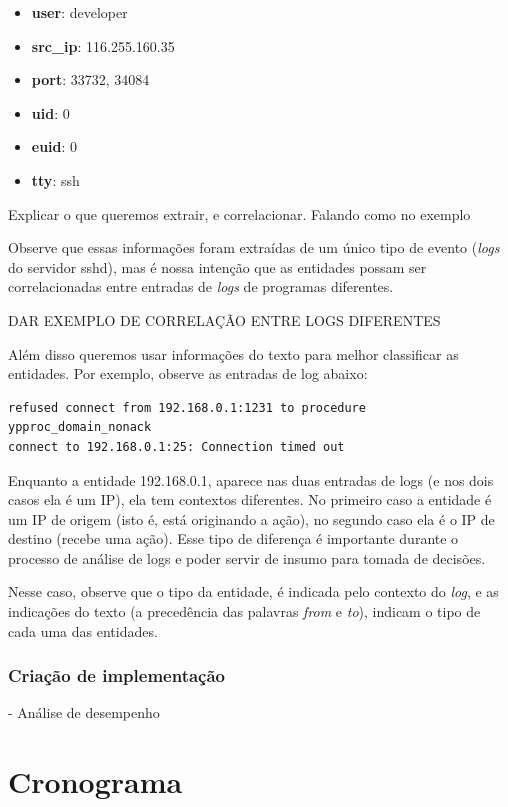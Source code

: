 \documentclass[
	12pt,				%
	openright,			%
	twoside,			%
	a4paper,			%
	english,			%
	french,				%
	spanish,			%
	brazil,				%
	]{abntex2}
\begin{document}
\begin{itemize}
	\item \textbf{user}: developer	
	\item \textbf{src\_ip}: 116.255.160.35	
	\item \textbf{port}: 33732, 34084	
	\item \textbf{uid}: 0	
	\item \textbf{euid}: 0	
	\item \textbf{tty}: ssh 
\end{itemize}

Explicar o que queremos extrair, e correlacionar. Falando como no exemplo

Observe que essas informações foram extraídas de um único tipo de evento (\emph{logs} do servidor sshd), mas é nossa intenção que as entidades possam ser correlacionadas entre entradas de \emph{logs} de programas diferentes.

DAR EXEMPLO DE CORRELAÇÃO ENTRE LOGS DIFERENTES

Além disso queremos usar informações do texto para melhor classificar as entidades.
Por exemplo, observe as entradas de log abaixo:

{\tiny
\begin{verbatim}
refused connect from 192.168.0.1:1231 to procedure ypproc_domain_nonack 
connect to 192.168.0.1:25: Connection timed out
\end{verbatim}
}

Enquanto a entidade 192.168.0.1, aparece nas duas entradas de logs (e nos dois casos ela é um IP), ela tem contextos diferentes. No primeiro caso a entidade é um IP de origem (isto é, está originando a ação), no segundo caso ela é o IP de destino (recebe uma ação). Esse tipo de diferença é importante durante o processo de análise de logs e poder servir de insumo para tomada de decisões.

Nesse caso, observe que o tipo da entidade, é indicada pelo contexto do \emph{log}, e as indicações do texto (a precedência das palavras \emph{from} e \emph{to}), indicam o tipo de cada uma das entidades.

\cite{bird2009natural}

\subsection{Criação de implementação}

- Análise de desempenho

\chapter{Cronograma}\label{chap:cronograma}
\end{document}
